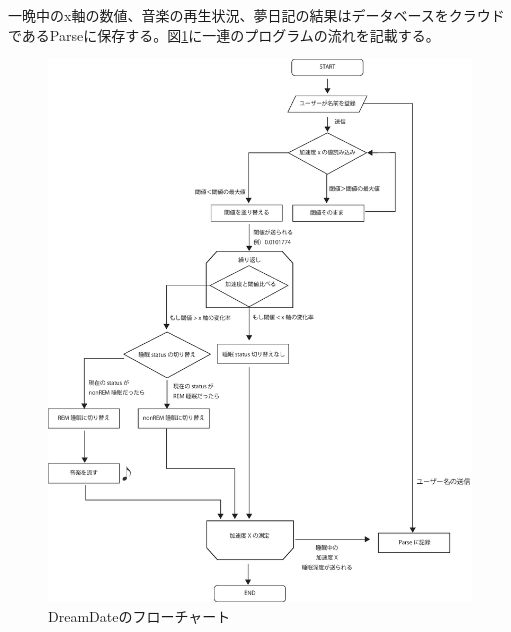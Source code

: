 一晩中のx軸の数値、音楽の再生状況、夢日記の結果はデータベースをクラウドであるParseに保存する。図\ref{system}に一連のプログラムの流れを記載する。
\begin{figure}[htbp]
\begin{center}
\includegraphics[width=15cm]{eps/system.eps}
\caption{DreamDateのフローチャート}
\label{system}
\end{center}
\end{figure}

